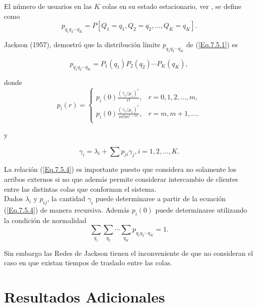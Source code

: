 \documentclass{article}
\begin{document}
El n\'umero de usuarios en las $K$ colas en su estado estacionario, ver \cite{Bhat}, se define como
\begin{equation}\label{Eq.7.5.1}
p_{q_{1}q_{2}\cdots
q_{K}}=P\left[Q_{1}=q_{1},Q_{2}=q_{2},\ldots,Q_{K}=q_{K}\right].
\end{equation}

Jackson (1957), demostr\'o que la distribuci\'on l\'imite
$p_{q_{1}q_{2}\cdots q_{K}}$ de (\ref{Eq.7.5.1}) es

\begin{equation}\label{Eq.7.5.2}
p_{q_{1}q_{2}\cdots
q_{K}}=P_{1}\left(q_{1}\right)P_{2}\left(q_{2}\right)\cdots
P_{K}\left(q_{K}\right),
\end{equation}

donde
\begin{equation}\label{Eq.7.5.3}
p_{i}\left(r\right)=\left\{\begin{array}{cc}
 p_{i}\left(0\right)\frac{\left(\gamma_{i}/\mu_{i}\right)^{r}}{r!},  & r=0,1,2,\ldots,m, \\
 p_{i}\left(0\right)\frac{\left(\gamma_{i}/\mu_{i}\right)^{r}}{m!m^{r-m}}, & r=m,m+1,\ldots .\\
\end{array}\right.
\end{equation}

y

\begin{equation}\label{Eq.7.5.4}
\gamma_{i}=\lambda_{i}+\sum p_{ji}\gamma_{j},\textrm{
}i=1,2,\ldots,K.
\end{equation}

La relaci\'on (\ref{Eq.7.5.4}) es importante puesto que considera no solamente los arribos externos si no que adem\'as permite considerar intercambio de clientes entre las distintas colas que conforman el sistema.\\

Dados $\lambda_{i}$ y $p_{ij}$, la cantidad $\gamma_{i}$ puede determinarse a partir de la ecuaci\'on (\ref{Eq.7.5.4}) de manera recursiva. Adem\'as $p_{i}\left(0\right)$ puede determinarse utilizando la condici\'on de normalidad
\[\sum_{q_{1}}\sum_{q_{2}}\cdots\sum_{q_{K}}p_{q_{1}q_{2}\cdots q_{K}}=1.\]

Sin embargo las Redes de Jackson tienen el inconveniente de que no consideran el caso en que existan tiempos de traslado entre las colas. 



\section{Resultados Adicionales}
\end{document}
